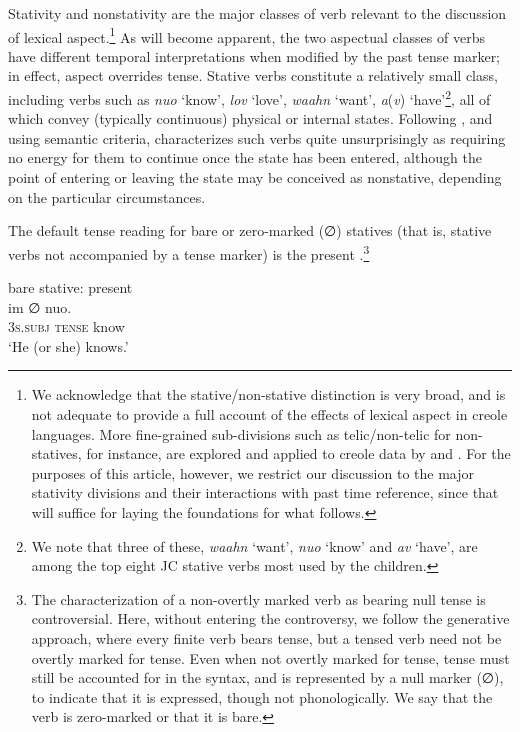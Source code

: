 \documentclass[output=paper,colorlinks,citecolor=brown]{langscibook}
\begin{document}
Stativity and nonstativity are the major classes of verb relevant to the discussion of lexical aspect.\footnote{We acknowledge that the stative\slash non-stative distinction is very broad, and is not adequate to provide a full account of the effects of lexical aspect in creole languages. More fine-grained sub-divisions such as telic\slash non-telic for non-statives, for instance, are explored and applied to creole data by \citet{Gooden2008,mcphee2003} and \citet{Hackert2004}. For the purposes of this article, however, we restrict our discussion to the major stativity divisions and their interactions with past time reference, since that will suffice for laying the foundations for what follows.} As will become apparent, the two aspectual classes of verbs have different temporal interpretations when modified by the past tense marker; in effect, aspect overrides tense. Stative verbs constitute a relatively small class, including verbs such as \textit{nuo} ‘know’, \textit{lov} ‘love’, \textit{waahn} ‘want’, \textit{a}(\textit{v}) ‘have’\footnote{We note that three of these, \textit{waahn} ‘want’, \textit{nuo} ‘know’ and \textit{av} ‘have’, are among the top eight JC stative verbs most used by the children.}, all of which convey (typically continuous) physical or internal states. Following \citet{Vendler1967}, and using semantic criteria, \citet[63]{andersen1990papiamentu} characterizes such verbs quite unsurprisingly as requiring no energy for them to continue once the state has been entered, although the point of entering or leaving the state may be conceived as nonstative, depending on the particular circumstances.

The default tense reading for bare or zero-marked (∅) statives (that is, stative verbs not accompanied by a tense marker) is the present \citep[33]{winford1993predication}.\footnote{The characterization of a non-overtly marked verb as bearing null tense is controversial. Here, without entering the controversy, we follow the generative approach, where every finite verb bears tense, but a tensed verb need not be overtly marked for tense. Even when not overtly marked for tense, tense must still be accounted for in the syntax, and is represented by a null marker (∅), to indicate that it is expressed, though not phonologically. We say that the verb is zero-marked or that it is bare.}

\ea \label{bkm:messamK:1}bare stative: present\\
\gll im ∅  nuo.\\
 3\textsc{s.subj} \textsc{tense} know  \\
\glt ‘He (or she) knows.’
\z
\end{document}

